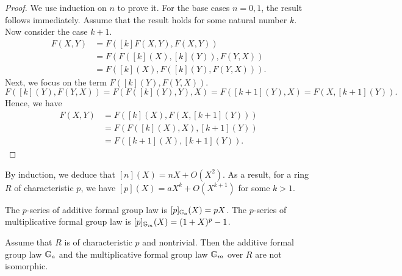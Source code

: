 \begin{proof}
    We use induction on $n$ to prove it. For the base cases $n = 0,1$, the result follows immediately.
    Assume that the result holds for some natural number $k$. Now consider the case $k+1$.
    \begin{align*}
        [k+1]F(X,Y) &= F([k]F(X,Y), F(X,Y)) \\
            & = F(F([k](X), [k](Y)), F(Y,X)) \\
            & = F ([k](X), F([k](Y), F(Y,X))).
    \end{align*}
    Next, we focus on the term $F([k](Y), F(Y,X))$.
    \begin{equation*}
        F([k](Y), F(Y,X)) = F(F([k](Y), Y), X) = F([k+1](Y), X) = F(X,[k+1](Y)).
    \end{equation*}
    Hence, we have
    \begin{align*}
        [k+1]F(X,Y) & = F ([k](X), F(X,[k+1](Y))) \\
            & = F (F ([k](X), X), [k+1](Y)) \\
            & = F ([k+1](X), [k+1](Y)).
    \end{align*}
\end{proof}

\begin{remark}
    By induction, we deduce that $[n](X) = nX + O(X^2)$. As a result, for a ring $R$ of
    characteristic $p$, we have $[p](X) = a X ^ k + O(X ^ {k+1})$ for some $k> 1$.
\end{remark}

\begin{example}
    The $p$-series of additive formal group law is $[p]_{\mathbb{G}_a} (X) = p X$.
    The $p$-series of multiplicative formal group law is $[p]_{\mathbb{G}_m}(X) = (1+X)^p - 1$.
\end{example}

\begin{proposition}
    Assume that $R$ is of characteristic $p$ and nontrivial. Then the additive formal group law
    $\mathbb{G}_a$ and the multiplicative formal group law $\mathbb{G}_m$ over $R$ are not isomorphic.
\end{proposition}

